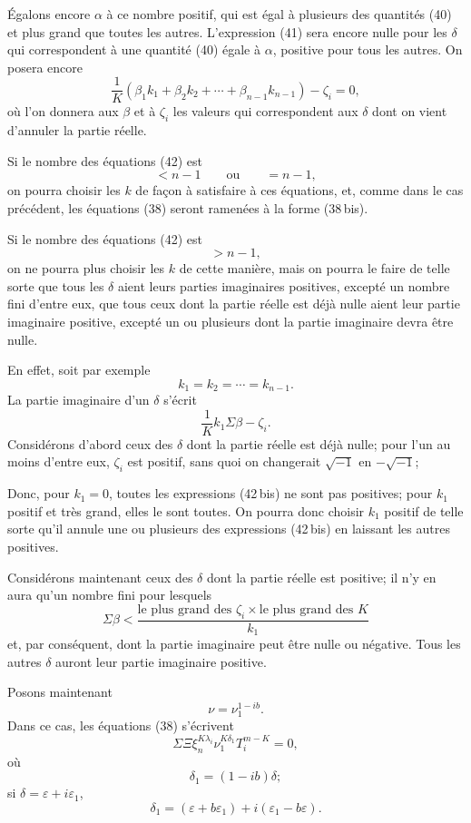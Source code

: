 \documentclass[11pt]{article}
\begin{document}
Égalons encore $\alpha$ à ce nombre positif, qui est égal à plusieurs des quantités (40) et plus grand que toutes les autres. L’expression (41) sera encore nulle pour les $\delta$ qui correspondent à une quantité (40) égale à $\alpha$, positive pour tous les autres. On posera encore
\begin{equation*}\tag{42}
\frac1K(\beta_1k_1+\beta_2k_2+\cdots+\beta_{n-1}k_{n-1})-\zeta_i=0,
\end{equation*}
où l’on donnera aux $\beta$ et à $\zeta_i$ les valeurs qui correspondent aux $\delta$ dont on vient d’annuler la partie réelle.

Si le nombre des équations (42) est
\[
<n-1\qquad \text{ou}\qquad =n-1,
\]
on pourra choisir les $k$ de façon à satisfaire à ces équations, et, comme dans le cas précédent, les équations (38) seront ramenées à la forme (38\,bis).

Si le nombre des équations (42) est
\[
>n-1,
\]
on ne pourra plus choisir les $k$ de cette manière, mais on pourra le faire de telle sorte que tous les $\delta$ aient leurs parties imaginaires positives, excepté un nombre fini d’entre eux, que tous ceux dont la partie réelle est déjà nulle aient leur partie imaginaire positive, excepté un ou plusieurs dont la partie imaginaire devra être nulle.

En effet, soit par exemple
\[
k_1=k_2=\cdots=k_{n-1}.
\]
La partie imaginaire d’un $\delta$ s’écrit
\begin{equation*}\tag{42\,bis}
\frac1K k_1\Sigma\beta-\zeta_i.
\end{equation*}
Considérons d’abord ceux des $\delta$ dont la partie réelle est déjà nulle; pour l’un au moins d’entre eux, $\zeta_i$ est positif, sans quoi on changerait $\sqrt{-1}$ en $-\sqrt{-1}$;

Donc, pour $k_1=0$, toutes les expressions (42\,bis) ne sont pas positives; pour $k_1$ positif et très grand, elles le sont toutes. On pourra donc choisir $k_1$ positif de telle sorte qu’il annule une ou plusieurs des expressions (42\,bis) en laissant les autres positives.

Considérons maintenant ceux des $\delta$ dont la partie réelle est positive; il n’y en aura qu’un nombre fini pour lesquels
\[
\Sigma\beta<\frac{\text{le plus grand des }\zeta_i\times \text{le plus grand des }K}{k_1}
\]
et, par conséquent, dont la partie imaginaire peut être nulle ou négative. Tous les autres $\delta$ auront leur partie imaginaire positive.

Posons maintenant
\[
\nu=\nu_1^{1-ib}.
\]
Dans ce cas, les équations (38) s’écrivent
\[
\Sigma\Xi\xi_n^{K\lambda_i}\nu_1^{K\delta_1}T_i^{m-K}=0,
\]
où
\[
\delta_1=(1-ib)\delta;
\]
si $\delta=\varepsilon+i\varepsilon_1$,
\[
\delta_1=(\varepsilon+b\varepsilon_1)+i(\varepsilon_1-b\varepsilon).
\]
\end{document}
